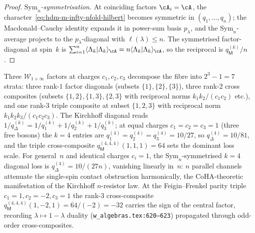 \begin{proof}
\emph{$\mathrm{Sym}_n$-symmetrisation.} At coinciding factors
$\cA_i=\cA$, the character~\eqref{eq:hdm-m-infty-nfold-hilbert}
becomes symmetric in $(q_1,\ldots,q_n)$; the Macdonald--Cauchy
identity expands it in power-sum basis $p_\lambda$, and the
$\mathrm{Sym}_n$-average projects to the $p_\lambda$-diagonal with
$\ell(\lambda)\leq n$. The symmetrised factor-diagonal at spin~$k$
is $\sum_{i=1}^n\langle\Lambda_k|\Lambda_k\rangle_\cA = n\langle
\Lambda_k|\Lambda_k\rangle_\cA$, so the reciprocal is
$q_\mathsf M^{(k)}/n$.
\end{proof}

\begin{example}
\label{ex:hdm-m-infty-nfold-examples}
Three $\mathcal W_{1+\infty}$ factors at charges $c_1,c_2,c_3$
decompose the fibre into $2^3-1=7$ strata: three rank-$1$ factor
diagonals (subsets $\{1\},\{2\},\{3\}$), three rank-$2$ cross
composites (subsets $\{1,2\},\{1,3\},\{2,3\}$ with reciprocal norms
$k_1k_2/(c_1c_2)$ etc.), and one rank-$3$ triple composite at subset
$\{1,2,3\}$ with reciprocal norm $k_1k_2k_3/(c_1c_2c_3)$. The
Kirchhoff diagonal reads
$1/q_\Delta^{(k)}=1/q_1^{(k)}+1/q_2^{(k)}+1/q_3^{(k)}$; at equal
charges $c_1=c_2=c_3=1$ (three free bosons) the $k=4$ entries are
$q_1^{(4)}=q_2^{(4)}=q_3^{(4)}=10/27$, so $q_\Delta^{(4)}=10/81$,
and the triple cross-composite $q_\mathsf M^{(4,4,4)}(1,1,1)=64$
sets the dominant loss scale. For general~$n$ and identical charges
$c_i=1$, the $\mathrm{Sym}_n$-symmetrised $k=4$ diagonal loss is
$q_\Delta^{(4)}=10/(27n)$, vanishing linearly in~$n$: $n$ parallel
channels attenuate the single-spin contact obstruction harmonically,
the CoHA-theoretic manifestation of the Kirchhoff $n$-resistor law.
At the Feigin--Frenkel parity triple $c_1=1,c_2=-2,c_3=1$ the
rank-$3$ cross-composite $q_\mathsf M^{(4,4,4)}(1,-2,1)=64/(-2)=-32$
carries the sign of the central factor, recording
$\lambda\mapsto 1-\lambda$ duality
(\texttt{w\_algebras.tex:620--623}) propagated through odd-order
cross-composites.
\end{example}

